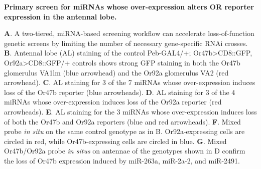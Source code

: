 {\bf Primary screen for miRNAs whose over-expression alters OR reporter expression in the antennal lobe.}

\textbf{A}.
A two-tiered, miRNA-based screening workflow can accelerate loss-of-function genetic screens by limiting the number of necessary gene-specific RNAi crosses.
\textbf{B}.
Antennal lobe (AL) staining of the control Peb-GAL4/+; Or47b\textgreater{}CD8::GFP, Or92a\textgreater{}CD8::GFP/+ controls shows strong GFP staining in both the Or47b glomerulus VA1lm (blue arrowhead) and the Or92a glomerulus VA2 (red arrowhead).
\textbf{C}.
AL staining for 3 of the 7 miRNAs whose over-expression induces loss of the Or47b reporter (blue arrowheads).
\textbf{D}.
AL staining for 3 of the 4 miRNAs whose over-expression induces loss of the Or92a reporter (red arrowheads).
\textbf{E}.
AL staining for the 3 miRNAs whose over-expression induces loss of both the Or47b and Or92a reporters (blue and red arrowheads).
\textbf{F}.
Mixed probe \emph{in situ} on the same control genotype as in B.
Or92a-expressing cells are circled in red, while Or47b-expressing cells are circled in blue.
\textbf{G}.
Mixed Or47b/Or92a probe \emph{in situs} on antennae of the genotypes shown in D confirm the loss of Or47b expression induced by miR-263a, miR-2a-2, and miR-2491.
\label{fig:1}